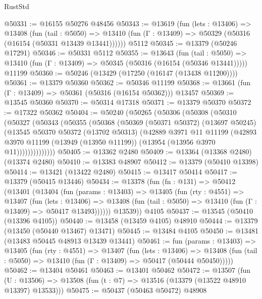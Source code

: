 \begin{lexlean}{RustStd}
\begin{coremodule}
@50331 := @16155 @50276 @48456
@50343 := @13619
    (fun (lets : @13406) =>
    @13408
      (fun (tail : @5050) =>
      @13410 (fun (Γ : @13409) => @50329 (@50316 (@16154 (@50331 @13439 @13441))))))
    @5112
@50345 := @13379 (@50246 @17291)
@50346 := @50331 @5112
@50355 := @13643
    (fun (tail : @5050) => @13410 (fun (Γ : @13409) => @50345 (@50316 (@16154 (@50346 @13441)))))
    @11199
@50360 := @50246 (@13429 (@17250 (@16147 (@13438 @11200))))
@50361 := @13379 @50360
@50362 := @50346 @11199
@50368 := @13661 (fun (Γ : @13409) => @50361 (@50316 (@16154 @50362))) @13457
@50369 := @13545 @50360
@50370 := @50314 @17318
@50371 := @13379 @50370
@50372 := @17322 @50362
@50404 := @50240
    (@50265
      (@50306
        (@50308
          (@50310
            (@50327
              (@50343
                (@50355
                  (@50368
                    (@50369
                      (@50371 @50372)
                      (@13697 @50245)
                      (@13545
                        @50370
                        @50372
                        (@13702 @50313)
                        (@42889
                          @3971
                          @11
                          @11199
                          (@42893
                            @3970
                            @11199
                            (@13949 (@13950 @11199))
                            (@13954 (@13956 @3970 @11))))))))))))))
@50405 := @13362 @2480
@50409 := @13364 (@13368 @2480) (@13374 @2480)
@50410 := @13383 @48907
@50412 := @13379 (@50410 @13398)
@50414 := @13421 (@13422 @2480)
@50415 := @13417 @50414
@50417 := @13379 (@50415 @13446)
@50434 := @13378
    (fun (fn : @131) =>
    @50412
      (@13401
        (@13404
          (fun (params : @13403) =>
          @13405
            (fun (rty : @4551) =>
            @13407
              (fun (lets : @13406) =>
              @13408 (fun (tail : @5050) => @13410 (fun (Γ : @13409) => @50417 @13493))))))
        @13539))
    @4105
@50437 := @13545 (@50410 (@13396 @4105))
@50440 := @13458 (@13459 @4105) @48910
@50444 := @13379 (@13450 (@50440 @13467) @13471)
@50445 := @13484 @4105
@50450 := @13481 (@13483 @50445 @48913 @13439 @13441)
@50461 := fun (params : @13403) =>
  @13405
    (fun (rty : @4551) =>
    @13407
      (fun (lets : @13406) =>
      @13408 (fun (tail : @5050) => @13410 (fun (Γ : @13409) => @50417 (@50444 @50450)))))
@50462 := @13404 @50461
@50463 := @13401 @50462
@50472 := @13507
    (fun (U : @13506) => @13508 (fun (t : @7) => @13516 (@13379 (@13522 @48910 @13397) @13533)))
@50475 := @50437 (@50463 @50472) @48908

\end{coremodule}
\end{lexlean}
